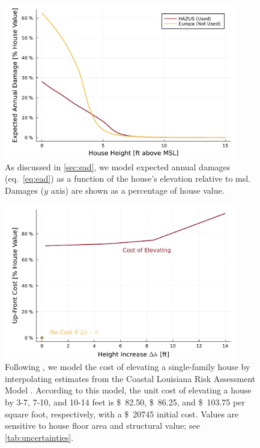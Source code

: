 \documentclass[11pt]{article}
\newcommand{\usd}[1]{\SI{#1}[\$]{}}
\begin{document}
\begin{figure}
    \centering
    \includegraphics[width=4in]{cost-expected-damage-emulator}
    \caption{
        As discussed in \cref{sec:ead}, we model expected annual damages (eq.~\ref{eq:ead}) as a function of the house's elevation relative to \gls{msl}.
        Damages ($y$ axis) are shown as a percentage of house value.
    }\label{fig:cost-expected-damage-emulator}
\end{figure}

\begin{figure}
    \centering
    \includegraphics[width=4in]{cost-up-front}
    \caption{
        Following \citet{zarekarizi_suboptimal:2020}, we model the cost of elevating a single-family house by interpolating estimates from the Coastal Louisiana Risk Assessment Model \citep{johnson_clara:2013}.
        According to this model, the unit cost of elevating a house by 3-7, 7-10, and 10-14 feet is \usd{82.50}, \usd{86.25}, and \usd{103.75} per square foot, respectively, with a \usd{20745} initial cost.
        Values are sensitive to house floor area and structural value; see \cref{tab:uncertainties}.
    }\label{fig:cost-up-front}
\end{figure}
\end{document}
